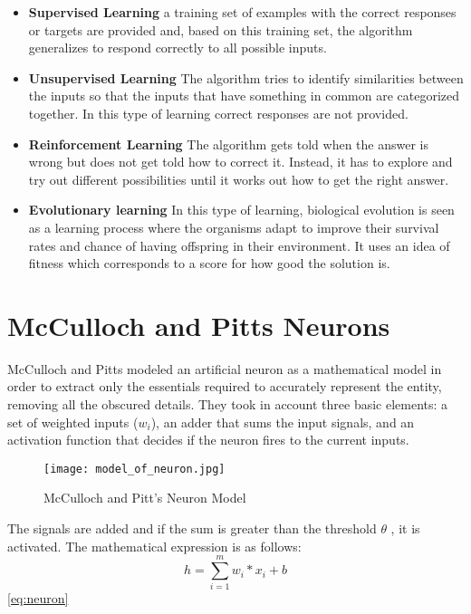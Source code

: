 \begin{itemize}
\item \textbf{Supervised Learning} a training set of examples with the correct responses or targets are provided and, based on this training set, the algorithm generalizes to respond correctly to all possible inputs.

\item \textbf{Unsupervised Learning} The algorithm tries to identify similarities between the inputs so that the inputs that have something in common are categorized together. In this type of learning correct responses are not provided.

\item \textbf{Reinforcement Learning} The algorithm gets told when the answer is wrong but does not get told how to correct it. Instead, it has to explore and try out different possibilities until it works out how to get the right answer. 

\item \textbf{Evolutionary learning} In this type of learning, biological evolution is seen as a learning process where the organisms adapt to improve their survival rates and chance of having offspring in their environment. It uses an idea of fitness which corresponds to a score for how good the solution is. 
\end{itemize}

\section{McCulloch and Pitts Neurons}
McCulloch and Pitts modeled an artificial neuron as a mathematical model in order to extract only the essentials required to accurately represent the entity, removing all the obscured details. They took in account three basic elements: a set of weighted inputs ($w_i$), an adder that sums the input signals, and an activation function that decides if the neuron fires to the current inputs.
\begin{figure}[h]
\centering
 
\texttt{[image: model\_of\_neuron.jpg]}
\caption{McCulloch and Pitt's Neuron Model}
\label{fig:neuron}
\end{figure}

The signals are added and if the sum is greater than the threshold $\theta$ , it is activated. The mathematical expression is as follows:\\
\begin{equation} \label{eq:neuron}
h=\sum_{i=1}^{m} w_i * x_i + b
\end{equation}\ref{eq:neuron}

